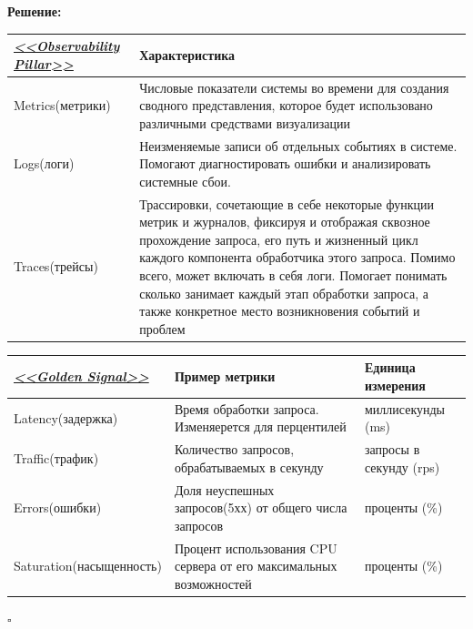\documentclass[12pt]{article}
\newenvironment{solution}
{
  \par\textbf{Решение:}\par\bigbreak
  \begingroup
}
{
  \par\bigbreak\hfill$\square$%
  \par\endgroup
}
\begin{document}
\begin{solution}
	
	\begin{tabular}{ |p{4cm}|p{11cm}|  } \hline
		\textit{\href{https://www.ibm.com/think/insights/observability-pillars}{<<Observability Pillar>>}} & Характеристика               \\ \hline
		  Metrics(метрики)                                                                                  &
        Числовые показатели системы во времени для создания сводного представления, которое будет использовано различными средствами визуализации
                                                                                                            \\ \hline
		  Logs(логи)                                                                                         &
        Неизменяемые записи об отдельных событиях в системе. Помогают диагностировать ошибки и анализировать системные сбои.
                                                                                                          \\ \hline
        Traces(трейсы)
		                                                                                                   &              
        Трассировки, сочетающие в себе некоторые функции метрик и журналов, фиксируя и отображая сквозное прохождение запроса, его путь и жизненный цикл каждого компонента обработчика этого запроса. Помимо всего, может включать в себя логи. Помогает понимать сколько занимает каждый этап обработки запроса, а также конкретное место возникновения событий и проблем                                                                                                   
                                                                                                           \\ \hline
	\end{tabular}
	
	\bigbreak
	
	\begin{tabular}{ |p{4cm}|p{8cm}|p{2cm}|  } \hline
		\textit{\href{https://sre.google/sre-book/monitoring-distributed-systems/}{<<Golden Signal>>}}   & Пример метрики 			 & Единица измерения    	\\ \hline
		Latency(задержка) & Время обработки запроса. Изменяерется для перцентилей &
        миллисекунды (ms) 		\\ \hline
		Traffic(трафик) & Количество запросов, обрабатываемых в секунду                       						     & запросы в секунду (rps) 	\\ \hline
		Errors(ошибки)  & Доля неуспешных запросов(5хх) от общего числа запросов         						     	 & проценты (\%) 			\\ \hline
		Saturation(насыщенность) & Процент использования CPU сервера от его максимальных возможностей                       						     & проценты (\%) 			\\ \hline
	\end{tabular}
	

\end{solution}
\end{document}
